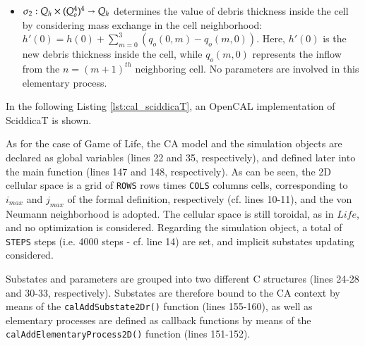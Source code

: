 \begin{itemize}
\begin{itemize}

\item $\sigma_2: Q_h \times (Q_o^4)^4 \shortrightarrow Q_h$ determines
  the value of debris thickness inside the cell by considering mass
  exchange in the cell neighborhood: $h'(0) = h(0) + \sum_{m=0}^3
  (q_o(0,m) - q_o(m,0))$. Here, $h'(0)$ is the new debris
  thickness inside the cell, while $q_o(m,0)$ represents the inflow from
  the $n=(m+1)^{th}$ neighboring cell. No parameters are involved in
  this elementary process.

\end{itemize}
\end{itemize}

In the following Listing \ref{lst:cal_sciddicaT}, an OpenCAL
implementation of SciddicaT is shown.



As for the case of Game of Life, the CA model and the simulation
objects are declared as global variables (lines 22 and 35,
respectively), and defined later into the main function (lines 147 and
148, respectively). As can be seen, the 2D cellular space is a grid
of \verb'ROWS' rows times \verb'COLS' columns cells, corresponding to
$i_{max}$ and $j_{max}$ of the formal definition, respectively
(cf. lines 10-11), and the von Neumann neighborhood is adopted. The
cellular space is still toroidal, as in $Life$, and no optimization is
considered. Regarding the simulation object, a total of \verb'STEPS'
steps (i.e. 4000 steps - cf. line 14) are set, and implicit substates
updating considered.

Substates and parameters are grouped into two different C structures
(lines 24-28 and 30-33, respectively). Substates are therefore bound to
the CA context by means of the \verb'calAddSubstate2Dr()' function
(lines 155-160), as well as elementary processes are defined as
callback functions by means of the \verb'calAddElementaryProcess2D()'
function (lines 151-152).

